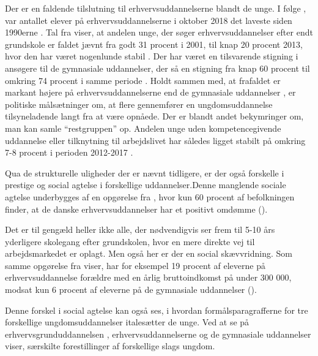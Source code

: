 Der er en faldende tilslutning til erhvervsuddannelserne blandt de unge.
I følge \citeauthor{danmarksstatistikErhvervsuddannelserDanmark20192019}, var antallet elever på erhvervsuddannelserne i oktober 2018 det laveste siden 1990erne \autocite[s. 10]{danmarksstatistikErhvervsuddannelserDanmark20192019}.
Tal fra \citeauthor{borne-ogundervisningsministerietHvemOgHvor} viser, at andelen unge, der søger erhvervsuddannelser efter endt grundskole er faldet jævnt fra godt 31 procent i 2001, til knap 20 procent 2013, hvor den har været nogenlunde stabil \autocite[s. 6]{borne-ogundervisningsministerietHvemOgHvor}.
Der har været en tilsvarende stigning i ansøgere til de gymnasiale uddannelser, der så en stigning fra knap 60 procent til omkring 74 procent i samme periode \autocite[s 5f]{undervisningsministerietOg10Klasseelevernes2017}.
Holdt sammen med, at frafaldet er markant højere på erhvervsuddannelserne end de gymnasiale uddannelser \autocite{danskegymnasierFuldforelseOgKarakterer2019}, er politiske målsætninger om, at flere gennemfører en ungdomsuddannelse tilsyneladende langt fra at være opnåede.
Der er blandt andet bekymringer om, man kan samle “restgruppen” op.
Andelen unge uden kompetencegivende uddannelse eller tilknytning til arbejdslivet har således ligget stabilt på omkring 7-8 procent i perioden 2012-2017 \autocite[s. 9]{andersenUngeUdenUddannelse2019}.

Qua de strukturelle uligheder der er nævnt tidligere, er der også forskelle i prestige og social agtelse i forskellige uddannelser.Denne manglende sociale agtelse underbygges af en opgørelse fra \citeauthor{danmarksstatistikErhvervsuddannelserDanmark20192019}, hvor kun 60 procent af befolkningen finder, at de danske erhvervsuddannelser har et positivt omdømme (\citeyear[s. 7]{danmarksstatistikErhvervsuddannelserDanmark20192019}).

Det er til gengæld heller ikke alle, der nødvendigvis ser frem til 5-10 års yderligere skolegang efter grundskolen, hvor en mere direkte vej til arbejdsmarkedet er oplagt.
Men også her er der en social skævvridning.
Som samme opgørelse fra \citeauthor{danmarksstatistikErhvervsuddannelserDanmark20192019} viser, har for eksempel 19 procent af eleverne på erhvervsuddannelse forældre med en årlig bruttoindkomst på under 300 000, modsat kun 6 procent af eleverne på de gymnasiale uddannelser (\citeyear[s. 6]{danmarksstatistikErhvervsuddannelserDanmark20192019}). 

Denne forskel i social agtelse kan også ses, i hvordan formålsparagrafferne for tre forskellige ungdomsuddannelser italesætter de unge. Ved at se på erhvervsgrunduddannelsen \autocite[§ 1]{uddannelsesministerietBekendtgorelseAfLov2016a}, erhvervsuddannelserne \autocite[§1, stk.2]{uddannelsesministerietBekendtgorelseAfLov2020} og de gymnasiale uddannelser \autocite[§1]{uddannelsesministerietBekendtgorelseAfLov2019} viser, særskilte forestillinger af forskellige slags ungdom.


